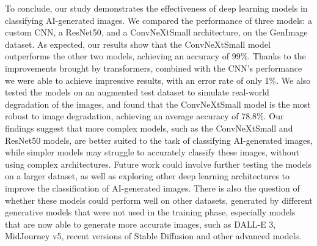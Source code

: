 \documentclass[runningheads]{llncs}
\begin{document}
To conclude, our study demonstrates the effectiveness of deep learning models in classifying AI-generated images. We compared the performance of three models: a custom CNN, a ResNet50, and a ConvNeXtSmall architecture, on the GenImage dataset. As expected, our results show that the ConvNeXtSmall model outperforms the other two models, achieving an accuracy of 99\%. Thanks to the improvements brought by transformers, combined with the CNN's performance we were able to achieve impressive results, with an error rate of only 1\%.  We also tested the models on an augmented test dataset to simulate real-world degradation of the images, and found that the ConvNeXtSmall model is the most robust to image degradation, achieving an average accuracy of 78.8\%. Our findings suggest that more complex models, such as the ConvNeXtSmall and ResNet50 models, are better suited to the task of classifying AI-generated images, while simpler models may struggle to accurately classify these images, without using complex architectures. Future work could involve further testing the models on a larger dataset, as well as exploring other deep learning architectures to improve the classification of AI-generated images. There is also the question of whether these models could perform well on other datasets, generated by different generative models that were not used in the training phase, especially  models that are now able to generate more accurate images, such as DALL-E 3, MidJourney v5, recent versions of Stable Diffusion and other advanced models. 
%
%
%


\end{document}
